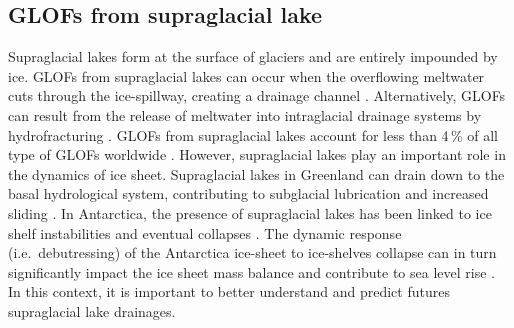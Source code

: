 \subsection{GLOFs from supraglacial lake}


Supraglacial lakes form at the surface of glaciers and are entirely impounded by ice. GLOFs from supraglacial lakes can occur when the overflowing meltwater cuts through the ice-spillway, creating a drainage channel \citep{Raymond&Nolan2000}. Alternatively, GLOFs can result from the release of meltwater into intraglacial drainage systems by hydrofracturing \citep[e.g.][]{Bjornsson1976, Boon&Sharp2003}. GLOFs from supraglacial lakes account for less than 4\,\% of all type of GLOFs worldwide \citep{Lutzow&al2023}. However, supraglacial lakes play an important role in the dynamics of ice sheet. Supraglacial lakes in Greenland \citep[see][]{Mcmillan&al2007} can drain down to the basal hydrological system, contributing to subglacial lubrication and increased sliding \citep[e.g.][]{Schoof2010,Pimentel&Flowers2011,Tedesco&al2013}. In Antarctica, the presence of supraglacial lakes has been linked to ice shelf instabilities and eventual collapses \citep[e.g.][]{Banwell&al2013,Banwell&al2019}. The dynamic response (i.e.\ debutressing) of the Antarctica ice-sheet to ice-shelves collapse can in turn significantly impact the ice sheet mass balance and contribute to sea level rise \citep{Van&al2022}. In this context, it is important to better understand and predict futures supraglacial lake drainages. 

